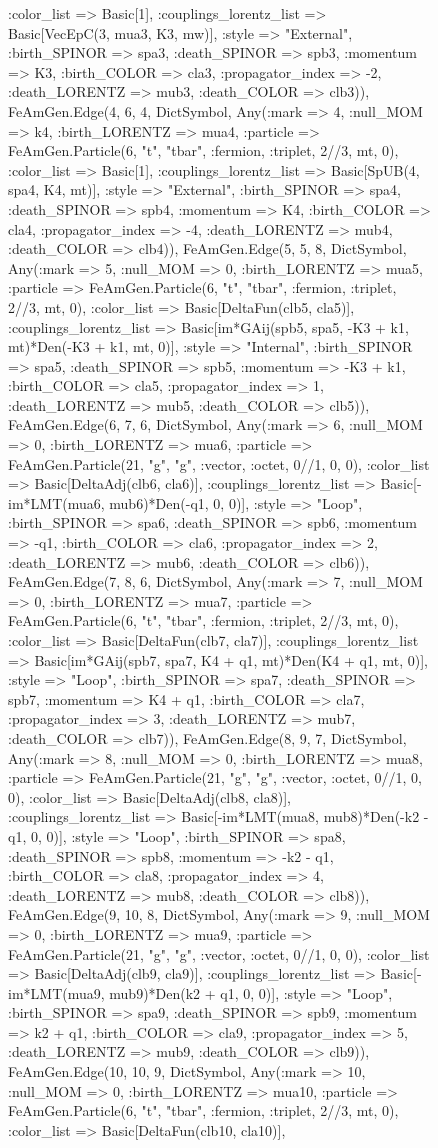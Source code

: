 \documentclass{revtex4}
\begin{document}
\begin{figure}[!htb]
\begin{center}
{:color_list => Basic[1], :couplings_lorentz_list => Basic[VecEpC(3, mua3, K3, mw)], :style => "External", :birth_SPINOR => spa3, :death_SPINOR => spb3, :momentum => K3, :birth_COLOR => cla3, :propagator_index => -2, :death_LORENTZ => mub3, :death_COLOR => clb3)), FeAmGen.Edge(4, 6, 4, Dict{Symbol, Any}(:mark => 4, :null_MOM => k4, :birth_LORENTZ => mua4, :particle => FeAmGen.Particle(6, "t", "tbar", :fermion, :triplet, 2//3, mt, 0), :color_list => Basic[1], :couplings_lorentz_list => Basic[SpUB(4, spa4, K4, mt)], :style => "External", :birth_SPINOR => spa4, :death_SPINOR => spb4, :momentum => K4, :birth_COLOR => cla4, :propagator_index => -4, :death_LORENTZ => mub4, :death_COLOR => clb4)), FeAmGen.Edge(5, 5, 8, Dict{Symbol, Any}(:mark => 5, :null_MOM => 0, :birth_LORENTZ => mua5, :particle => FeAmGen.Particle(6, "t", "tbar", :fermion, :triplet, 2//3, mt, 0), :color_list => Basic[DeltaFun(clb5, cla5)], :couplings_lorentz_list => Basic[im*GAij(spb5, spa5, -K3 + k1, mt)*Den(-K3 + k1, mt, 0)], :style => "Internal", :birth_SPINOR => spa5, :death_SPINOR => spb5, :momentum => -K3 + k1, :birth_COLOR => cla5, :propagator_index => 1, :death_LORENTZ => mub5, :death_COLOR => clb5)), FeAmGen.Edge(6, 7, 6, Dict{Symbol, Any}(:mark => 6, :null_MOM => 0, :birth_LORENTZ => mua6, :particle => FeAmGen.Particle(21, "g", "g", :vector, :octet, 0//1, 0, 0), :color_list => Basic[DeltaAdj(clb6, cla6)], :couplings_lorentz_list => Basic[-im*LMT(mua6, mub6)*Den(-q1, 0, 0)], :style => "Loop", :birth_SPINOR => spa6, :death_SPINOR => spb6, :momentum => -q1, :birth_COLOR => cla6, :propagator_index => 2, :death_LORENTZ => mub6, :death_COLOR => clb6)), FeAmGen.Edge(7, 8, 6, Dict{Symbol, Any}(:mark => 7, :null_MOM => 0, :birth_LORENTZ => mua7, :particle => FeAmGen.Particle(6, "t", "tbar", :fermion, :triplet, 2//3, mt, 0), :color_list => Basic[DeltaFun(clb7, cla7)], :couplings_lorentz_list => Basic[im*GAij(spb7, spa7, K4 + q1, mt)*Den(K4 + q1, mt, 0)], :style => "Loop", :birth_SPINOR => spa7, :death_SPINOR => spb7, :momentum => K4 + q1, :birth_COLOR => cla7, :propagator_index => 3, :death_LORENTZ => mub7, :death_COLOR => clb7)), FeAmGen.Edge(8, 9, 7, Dict{Symbol, Any}(:mark => 8, :null_MOM => 0, :birth_LORENTZ => mua8, :particle => FeAmGen.Particle(21, "g", "g", :vector, :octet, 0//1, 0, 0), :color_list => Basic[DeltaAdj(clb8, cla8)], :couplings_lorentz_list => Basic[-im*LMT(mua8, mub8)*Den(-k2 - q1, 0, 0)], :style => "Loop", :birth_SPINOR => spa8, :death_SPINOR => spb8, :momentum => -k2 - q1, :birth_COLOR => cla8, :propagator_index => 4, :death_LORENTZ => mub8, :death_COLOR => clb8)), FeAmGen.Edge(9, 10, 8, Dict{Symbol, Any}(:mark => 9, :null_MOM => 0, :birth_LORENTZ => mua9, :particle => FeAmGen.Particle(21, "g", "g", :vector, :octet, 0//1, 0, 0), :color_list => Basic[DeltaAdj(clb9, cla9)], :couplings_lorentz_list => Basic[-im*LMT(mua9, mub9)*Den(k2 + q1, 0, 0)], :style => "Loop", :birth_SPINOR => spa9, :death_SPINOR => spb9, :momentum => k2 + q1, :birth_COLOR => cla9, :propagator_index => 5, :death_LORENTZ => mub9, :death_COLOR => clb9)), FeAmGen.Edge(10, 10, 9, Dict{Symbol, Any}(:mark => 10, :null_MOM => 0, :birth_LORENTZ => mua10, :particle => FeAmGen.Particle(6, "t", "tbar", :fermion, :triplet, 2//3, mt, 0), :color_list => Basic[DeltaFun(clb10, cla10)], }
\end{center}
\end{figure}
\end{document}
